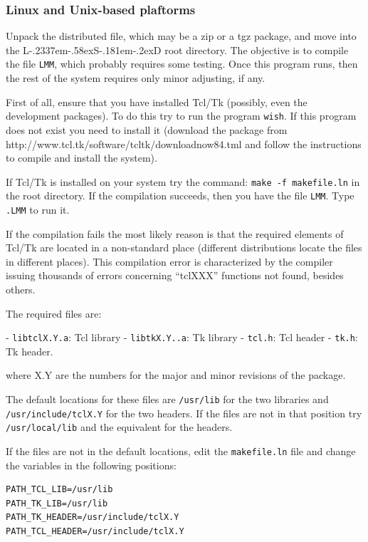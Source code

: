 \documentclass [11pt,a4paper] {book}
\def\LsD{{L\kern-.2337em\lower-.58ex\hbox{S}\kern-.181em\lower-.2ex\hbox{D}}\xspace}
\begin{document}
\subsubsection{Linux and Unix-based plaftorms}

Unpack the distributed file, which may be a zip or a tgz package, and move into the \LsD root directory. The objective is to compile the file \texttt{LMM}, which probably requires some testing. Once this program runs, then the rest of the system requires only minor adjusting, if any.

First of all, ensure that you have installed Tcl/Tk (possibly, even the development packages). To do this try to run the program \texttt{wish}. If this program does not exist you need to install it (download the package from http://www.tcl.tk/software/tcltk/downloadnow84.tml and follow the instructions to compile and install the system).

If Tcl/Tk is installed on your system try the command: \texttt{make -f makefile.ln} in the root directory. If the compilation succeeds, then you have the file \texttt{LMM}. Type \texttt{.LMM} to run it.

If the compilation fails the most likely reason is that the required elements of Tcl/Tk are located in a non-standard place (different distributions locate the files in different places). This compilation error is characterized by the compiler issuing thousands of errors concerning ``tclXXX'' functions not found, besides others.

The required files are:

- \texttt{libtclX.Y.a}: Tcl library 
- \texttt{libtkX.Y..a}: Tk library
- \texttt{tcl.h}: Tcl header
- \texttt{tk.h}: Tk header.

where X.Y are the numbers for the major and minor revisions of the package.

The default locations for these files are \texttt{/usr/lib} for the two libraries and \texttt{/usr/include/tclX.Y} for the two headers. If the files are not in that position try \texttt{/usr/local/lib} and the equivalent for the headers.

If the files are not in the default locations, edit the \texttt{makefile.ln} file and change the variables in the following positions:

\begin{minipage}[h]{10cm}
\small
\begin{verbatim}
PATH_TCL_LIB=/usr/lib
PATH_TK_LIB=/usr/lib
PATH_TK_HEADER=/usr/include/tclX.Y
PATH_TCL_HEADER=/usr/include/tclX.Y

\end{verbatim}
\normalsize
\end{minipage}
\end{document}
